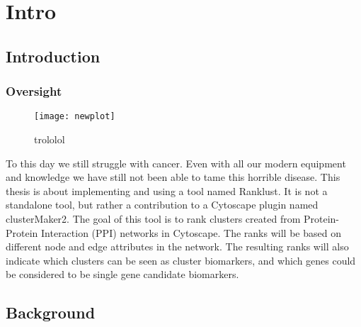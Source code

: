 \part{Intro}
\label{pa:intro}
\chapter{Introduction}
\section{Oversight}
\begin{figure}
    \label{fig:testfig}
    \texttt{[image: newplot]}
    \caption{trololol}
\end{figure}
To this day we still struggle with cancer. Even with all our modern equipment
and knowledge we have still not been able to tame this horrible disease. This
thesis is about implementing and using a tool named Ranklust. It is not a
standalone tool, but rather a contribution to a Cytoscape plugin named
clusterMaker2\cite{cm2}\cite{cm2-github}. The goal of this tool is to rank
clusters created from Protein-Protein Interaction (PPI) networks in Cytoscape.
The ranks will be based on different node and edge attributes in the network.
The resulting ranks will also indicate which clusters can be seen as cluster
biomarkers, and which genes could be considered to be single gene candidate
biomarkers. 

\chapter{Background}
